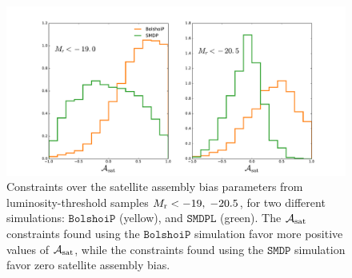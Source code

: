 \documentclass[12pt, preprint]{aastex}
\newcommand{\asat}{\mathcal{A}_{\rm sat}}
\begin{document}
\begin{figure}[p]~\\
\begin{center}
\includegraphics[width=\textwidth]{hist_comparison.pdf}
\caption{Constraints over the satellite assembly bias parameters from luminosity-threshold samples $M_{\rm r}<-19 ,\; -20.5$, for two different simulations: $\mathtt{BolshoiP}$ (yellow), and $\mathtt{SMDPL}$ (green). The $\asat$ constraints found using the $\mathtt{BolshoiP}$ simulation favor more positive values of $\asat$, while the constraints found using the $\mathtt{SMDP}$ simulation favor zero satellite assembly bias.}
\label{fig:asat_comparison}
\end{center}
\end{figure}

\clearpage
\end{document}
